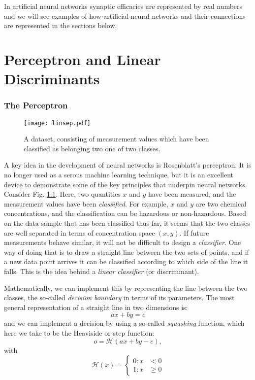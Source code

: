 In artificial neural networks synaptic efficacies are represented by real numbers and we will see examples of how artificial neural networks
and their connections are represented in the sections below.


\chapter{Perceptron and Linear Discriminants}
\subsection{The Perceptron}

\begin{figure}[!ht]
  \begin{center}
    \texttt{[image: linsep.pdf]}
  \end{center}
  \caption{A dataset, consisting of measurement values which have been classified as belonging two one of two classes.}
  \label{fig-linsep}
  \end{figure}
    
A key idea in the development of neural networks is  Rosenblatt's perceptron. It is no longer used as a serous machine learning technique, but it is an excellent
device to demonstrate some of the key principles that underpin neural networks. Consider Fig. \ref{fig-linsep}. Here, two quantities $x$ and $y$ have been measured,
and the measurement values have been \emph{classified}. For example, $x$ and $y$ are two chemical concentrations, and the classification can be hazardous
or non-hazardous. Based on the data sample that has been classified thus far, it seems that the two classes are well separated in terms of concentration space $(x,y)$.
If future measurements behave similar, it will not be difficult to design a \emph{classifier}. One way of doing that is to draw a straight line between the two sets of points,
and if a new data point arrives it can be classified according to which side of the line it falls. This is the idea behind a \emph{linear classifier} (or discriminant).

Mathematically, we can implement this by representing the line between the two classes, the so-called \emph{decision boundary} in terms of its parameters. The most general
representation of a straight line in two dimensions is:
$$
ax + by = c
$$
and we can implement a decision by using a so-called \emph{squashing} function, which here we take to be the Heaviside or step function:
\begin{equation}
  o = \mathcal{H}(ax + by -c),
  \label{eq-decision}
\end{equation}
with
$$
\mathcal{H}(x) = \left\{ \begin{array}{cc} 0 :  x &  < 0 \\ 1: x & \ge 0 \end{array} \right.
$$

